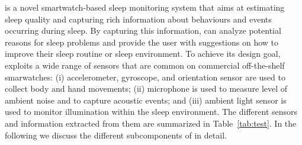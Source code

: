 

\systemname is a novel smartwatch-based sleep monitoring system that aims at estimating sleep quality and capturing rich information about
behaviours and events occurring during sleep. By capturing this information, \systemname can analyze potential reasons for sleep problems
and provide the user with suggestions on how to improve their sleep routine or sleep environment. To achieve its design goal, \systemname
exploits a wide range of sensors that are common on commercial off-the-shelf smarwatches: (i) accelerometer, gyroscope, and orientation
sensor are used to collect body and hand movements; (ii) microphone is used to measure level of ambient noise and to capture acoustic
events; and (iii) ambient light sensor is used to monitor illumination within the sleep environment. The different sensors and information
extracted from them are summarized in Table~\ref{tab:test}. In the following we discuss the different subcomponents of \systemname in
detail. 


